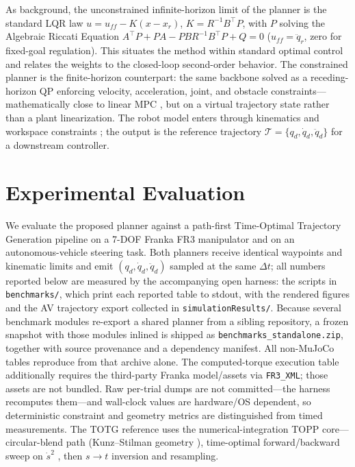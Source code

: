 As background, the unconstrained infinite-horizon limit of the planner is
the standard LQR law \(u=u_{ff}-K(x-x_r)\), \(K=R^{-1}B^\top P\), with
\(P\) solving the Algebraic Riccati Equation
\(A^\top P+PA-PBR^{-1}B^\top P+Q=0\) (\(u_{ff}=\ddot q_r\), zero for fixed-goal
regulation). This situates the method within standard optimal control and
relates the weights to the closed-loop second-order behavior. The
constrained planner is the finite-horizon counterpart: the same backbone
solved as a receding-horizon QP enforcing velocity, acceleration, joint,
and obstacle constraints---mathematically close to linear MPC
\cite{mayne2000}, but on a virtual trajectory state rather than a plant
linearization. The robot model enters through kinematics and workspace
constraints \cite{khatib1987}; the output is the reference trajectory
\(\mathcal T=\{q_d,\dot q_d,\ddot q_d\}\) for a downstream controller.

\section{Experimental Evaluation}\label{vi.-experimental-evaluation}

We evaluate the proposed planner against a path-first Time-Optimal
Trajectory Generation pipeline on a 7-DOF Franka FR3 manipulator and on
an autonomous-vehicle steering task. Both planners receive identical
waypoints and kinematic limits and emit \((q_d, \dot q_d, \ddot q_d)\)
sampled at the same \(\Delta t\); all numbers reported below are
measured by the accompanying open harness: the scripts in
\texttt{benchmarks/}, which print each reported table to stdout, with the
rendered figures and the AV trajectory export collected in
\texttt{simulationResults/}. Because several benchmark modules re-export a
shared planner from a sibling repository, a frozen snapshot with those modules
inlined is shipped as \texttt{benchmarks\_standalone.zip}, together with source
provenance and a dependency manifest. All non-MuJoCo tables reproduce from that
archive alone. The computed-torque execution table additionally requires the
third-party Franka model/assets via \texttt{FR3\_XML}; those assets are not
bundled. Raw per-trial dumps are not committed---the harness recomputes
them---and wall-clock values are hardware/OS dependent, so deterministic
constraint and geometry metrics are distinguished from timed measurements. The
TOTG reference uses the numerical-integration TOPP core---circular-blend
path (Kunz--Stilman geometry \cite{kunz2012}), time-optimal forward/backward
sweep on \(\dot s^2\) \cite{toppra}, then \(s\!\to\!t\) inversion and
resampling.

